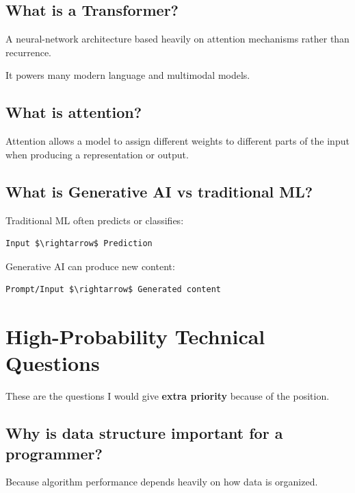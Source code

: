 \medskip

\subsection{What is a Transformer?}

A neural-network architecture based heavily on attention mechanisms rather than recurrence.

It powers many modern language and multimodal models.

\medskip

\subsection{What is attention?}

Attention allows a model to assign different weights to different parts of the input when producing a representation or output.

\medskip

\subsection{What is Generative AI vs traditional ML?}

Traditional ML often predicts or classifies:

\begin{lstlisting}
Input $\rightarrow$ Prediction
\end{lstlisting}

Generative AI can produce new content:

\begin{lstlisting}
Prompt/Input $\rightarrow$ Generated content
\end{lstlisting}

\medskip

\section{High-Probability Technical Questions}

These are the questions I would give \textbf{extra priority} because of the position.

\subsection{Why is data structure important for a programmer?}

Because algorithm performance depends heavily on how data is organized.

